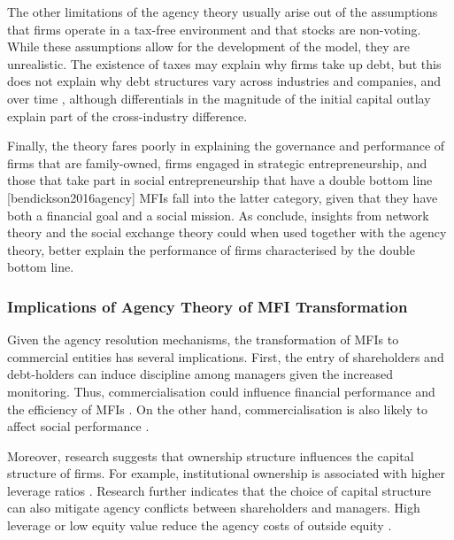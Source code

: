 \documentclass[a4paper,nobind]{templates/ociamthesis}
\begin{document}
The other limitations of the agency theory usually arise out of the assumptions that firms operate in a tax-free environment and that stocks are non-voting. While these assumptions allow for the development of the model, they are unrealistic. The existence of taxes may explain why firms take up debt, but this does not explain why debt structures vary across industries and companies, and over time \autocite{deangelo2015stable}, although differentials in the magnitude of the initial capital outlay explain part of the cross-industry difference.

Finally, the theory fares poorly in explaining the governance and performance of firms that are family-owned, firms engaged in strategic entrepreneurship, and those that take part in social entrepreneurship that have a double bottom line {[}bendickson2016agency{]} MFIs fall into the latter category, given that they have both a financial goal and a social mission. As \textcite{bendickson2016agency} conclude, insights from network theory and the social exchange theory could when used together with the agency theory, better explain the performance of firms characterised by the double bottom line.

\hypertarget{implications-of-agency-theory-of-mfi-transformation}{%
\subsubsection{Implications of Agency Theory of MFI Transformation}\label{implications-of-agency-theory-of-mfi-transformation}}

\noindent Given the agency resolution mechanisms, the transformation of MFIs to commercial entities has several implications. First, the entry of shareholders and debt-holders can induce discipline among managers given the increased monitoring. Thus, commercialisation could influence financial performance and the efficiency of MFIs \autocite{berger2006capital,khachatryan2017performance}. On the other hand, commercialisation is also likely to affect social performance \autocite{d2017ngos}.

Moreover, research suggests that ownership structure influences the capital structure of firms. For example, institutional ownership is associated with higher leverage ratios \autocite{sun2016ownership}. Research further indicates that the choice of capital structure can also mitigate agency conflicts between shareholders and managers. High leverage or low equity value reduce the agency costs of outside equity \autocite{berger2006capital}.
\end{document}
